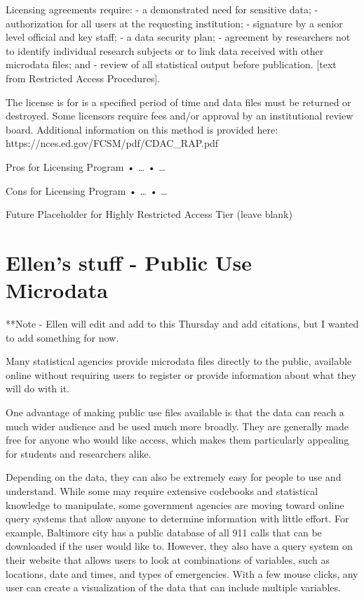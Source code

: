 \documentclass[12pt]{article}
\begin{document}
Licensing agreements require:
- a demonstrated need for sensitive data;
- authorization for all users at the requesting institution;
- signature by a senior level official and key staff;
- a data security plan;
- agreement by researchers not to identify individual research subjects or to link data received with other microdata files; and
- review of all statistical output before publication.
[text from Restricted Access Procedures].

The license is for is a specified period of time and data files must be returned or destroyed. Some licensors require fees and/or approval by an institutional review board. Additional information on this method is provided here: https://nces.ed.gov/FCSM/pdf/CDAC\_RAP.pdf

Pros for Licensing Program
•	…
•	…

Cons for Licensing Program
•	…
•	…






 

Future Placeholder for Highly Restricted Access Tier
(leave blank)



\section{Ellen's stuff - Public Use Microdata}

**Note - Ellen will edit and add to this Thursday and add citations, but I wanted to add something for now.

Many statistical agencies provide microdata files directly to the public, available online without requiring users to register or provide information about what they will do with it. 

One advantage of making public use files available is that the data can reach a much wider audience and be used much more broadly. They are generally made free for anyone who would like access, which makes them particularly appealing for students and researchers alike.

Depending on the data, they can also be extremely easy for people to use and understand. While some may require extensive codebooks and statistical knowledge to manipulate, some government agencies are moving toward online query systems that allow anyone to determine information with little effort. For example, Baltimore city has a public database of all 911 calls that can be downloaded if the user would like to. However, they also have a query system on their website that allows users to look at combinations of variables, such as locations, date and times, and types of emergencies. With a few mouse clicks, any user can create a visualization of the data that can include multiple variables. 
\end{document}
